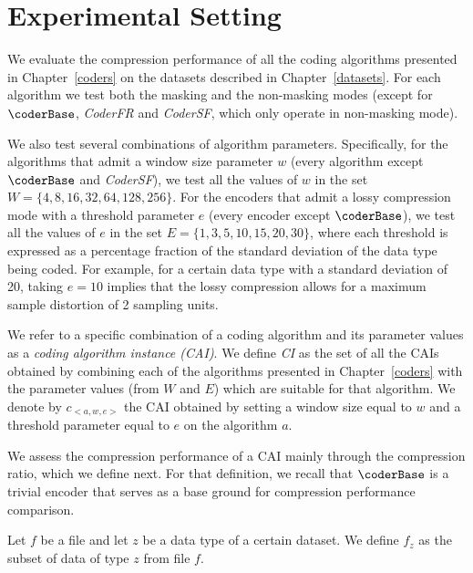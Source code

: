 \section{Experimental Setting}
\label{experiments:experiments}


We evaluate the compression performance of all the coding algorithms presented in Chapter~\ref{coders} on the datasets described in Chapter~\ref{datasets}. For each algorithm we test both the masking and the non-masking modes (except for $\coderBase$, \textit{CoderFR} and \textit{CoderSF}, which only operate in non-masking mode).


We also test several combinations of algorithm parameters. Specifically, for the algorithms that admit a window size parameter $w$ (every algorithm except $\coderBase$ and \textit{CoderSF}), we test all the values of $w$ in the set $W = \{4, 8, 16, 32, 64, 128, 256\}$. For the encoders that admit a lossy compression mode with a threshold parameter $e$ (every encoder except $\coderBase$), we test all the values of $e$ in the set $E= \{1, 3, 5, 10, 15, 20, 30\}$, where each threshold is expressed as a percentage fraction of the standard deviation of the data type being coded. For example, for a certain data type with a standard deviation of 20, taking $e=10$ implies that the lossy compression allows for a maximum sample distortion of 2 sampling units.


\vspace{+5pt}
\begin{defcion}
We refer to a specific combination of a coding algorithm and its parameter values as a \textit{coding algorithm instance (CAI)}. We define \textit{CI} as the set of all the CAIs obtained by combining each of the algorithms presented in Chapter~\ref{coders} with the parameter values (from $W$ and $E$) which are suitable for that algorithm. We denote by $c_{<a, w, e>}$ the CAI obtained by setting a window size equal to $w$ and a threshold parameter equal to $e$ on the algorithm $a$.
\end{defcion}


We assess the compression performance of a CAI mainly through the compression ratio, which we define next. For that definition, we recall that $\coderBase$ is a trivial encoder that serves as a base ground for compression performance comparison.


\clearpage


\begin{defcion}
Let $f$ be a file and let $z$ be a data type of a certain dataset. We define $f_z$ as the subset of data of type $z$ from file $f$.
\end{defcion}



